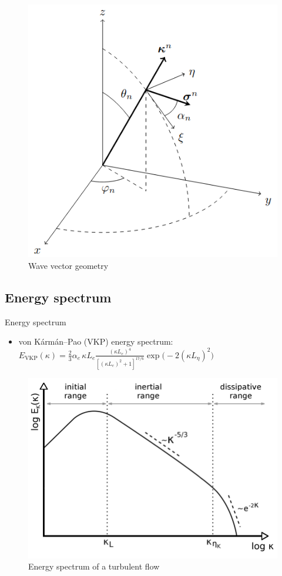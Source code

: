 \documentclass[11pt]{beamer}
\begin{document}
\begin{frame}
  \begin{figure}
    \centering
    \includegraphics[width=0.6\linewidth]{illustrations/WaveVectorGeometry.png}
    \caption{Wave vector geometry}
  \end{figure}
\end{frame}

\subsection{Energy spectrum}
\begin{frame}{Energy spectrum}
  \begin{itemize}
    \item von K\'arm\'an–Pao (VKP) energy spectrum: $E_{\mathrm{VKP}}(\kappa)=\frac{2}{3}\alpha_e\,\kappa L_e\frac{(\kappa L_e)^4}{[(\kappa L_e)^2+1]^{17/6}}\exp\big(-2(\kappa L_\eta)^2\big)$ 
  \end{itemize}
  \begin{figure}
    \centering
    \includegraphics[width=0.7\linewidth]{illustrations/energy-spectrum-example.png}
    \caption{Energy spectrum of a turbulent flow}
  \end{figure}
\end{frame}
\end{document}
